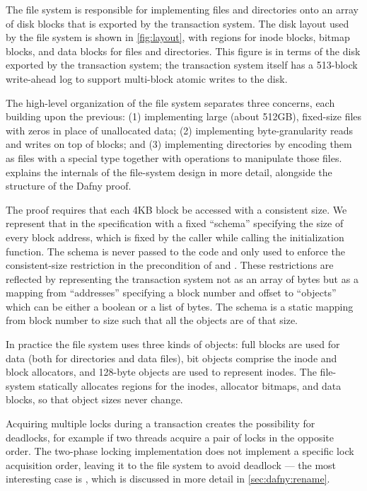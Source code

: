 The file system is responsible for implementing files and directories
onto an array of disk blocks that is exported by the transaction
system.  The disk layout used by the file system is shown in
\cref{fig:layout}, with regions for inode blocks, bitmap blocks,
and data blocks for files and directories. This figure is in terms of
the disk exported by the transaction system; the transaction system
itself has a 513-block write-ahead log to support multi-block atomic
writes to the disk.

The high-level organization of the file system separates three concerns, each
building upon the previous: (1) implementing large (about 512GB), fixed-size
files with zeros in place of unallocated data; (2) implementing byte-granularity
reads and writes on top of blocks; and (3) implementing
directories by encoding them as files with a special type together with
operations to manipulate those files.  explains the
internals of the file-system design in more detail, alongside the structure of
the Dafny proof.


The proof requires that each 4KB block be accessed with a consistent size. We
represent that in the specification with a fixed ``schema'' specifying the
size of every block address, which is fixed by the caller while calling the
initialization function. The schema is never passed to the code and only used
to enforce the consistent-size restriction in the precondition of 
and . These restrictions are reflected by representing the
transaction system not as an array of bytes but as a mapping from
``addresses'' specifying a block number and offset to ``objects'' which can be
either a boolean or a list of bytes. The schema is a static mapping from block
number to size such that all the objects are of that size.

In practice the file system uses three kinds of objects: full blocks are used
for data (both for directories and data files), bit objects comprise the inode
and block allocators, and 128-byte objects are used to represent inodes. The
file-system statically allocates regions for the inodes, allocator bitmaps,
and data blocks, so that object sizes never change.

Acquiring multiple locks during a transaction creates the possibility
for deadlocks, for example if two threads acquire a pair of locks in the opposite
order. The two-phase locking implementation does not implement a
specific lock acquisition order, leaving it to the file system to
avoid deadlock --- the most interesting case is , which is discussed
in more detail in \cref{sec:dafny:rename}.
